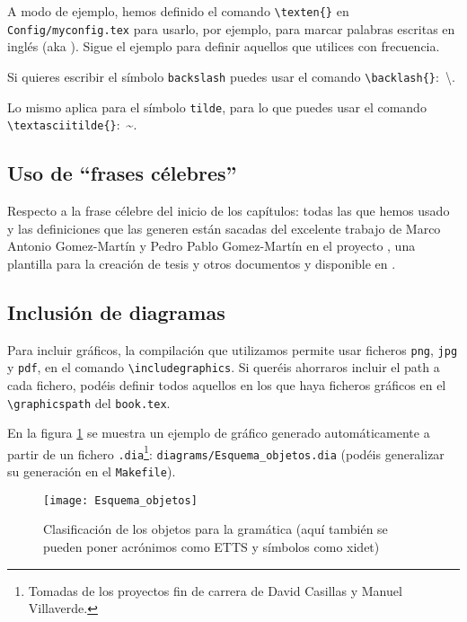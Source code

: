 A modo de ejemplo, hemos definido el comando \texttt{\textbackslash{}texten\{\}} en \texttt{Config/myconfig.tex} para usarlo, por ejemplo, para marcar palabras escritas en inglés (aka ). Sigue el ejemplo para definir aquellos que utilices con frecuencia.

Si quieres escribir el símbolo \texttt{backslash} puedes usar el comando \texttt{\textbackslash{}backlash\{\}}:~\textbackslash{}.

Lo mismo aplica para el símbolo \texttt{tilde}, para lo que puedes usar el comando \texttt{\textbackslash{}textasciitilde\{\}}:~\textasciitilde{}.


\subsection{Uso de ``frases célebres''}
\label{sec:uso-de-frases}

Respecto a la frase célebre del inicio de los capítulos: todas las que hemos usado y las definiciones que las generen están sacadas del excelente trabajo de Marco Antonio Gomez-Martín y Pedro Pablo Gomez-Martín en el proyecto \texis, una plantilla para la creación de tesis y otros documentos y disponible en \cite{texis}.


\subsection{Inclusión de diagramas}
\label{sec:diagrama}

Para incluir gráficos, la compilación que utilizamos permite usar ficheros \texttt{png}, \texttt{jpg} y \texttt{pdf}, en el comando \texttt{\textbackslash{}includegraphics}. Si queréis ahorraros incluir el path a cada fichero, podéis definir todos aquellos en los que haya ficheros gráficos en el \texttt{\textbackslash{}graphicspath} del \texttt{book.tex}.

En la figura \ref{fig:fig_clobj} se muestra un ejemplo de gráfico generado automáticamente a partir de un fichero \texttt{.dia}\footnote{Tomadas de los proyectos fin de carrera de David Casillas y Manuel Villaverde.}: \texttt{diagrams/Esquema\_objetos.dia} (podéis generalizar su generación en el \texttt{Makefile}).

\begin{figure}[tphb]
  \centering \texttt{[image: Esquema\_objetos]}
  \caption{Clasificación de los objetos para la gramática (aquí también se pueden poner acrónimos como \acs{ETTS} y símbolos como \ac{xidet})}
  \label{fig:fig_clobj}
\end{figure}



